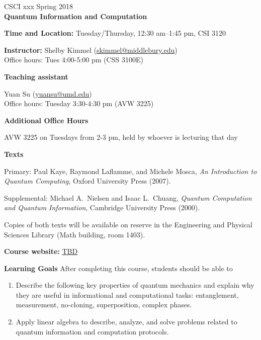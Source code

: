 \documentclass[11pt]{article}
\begin{document}

{\Large {CSCI xxx} \hfill Spring 2018} \\[3pt]
{\Large {\bf Quantum Information and Computation}}

\medskip
{\bf Time and Location:} Tuesday/Thursday, 12:30 am--1:45 pm, CSI 3120

\smallskip

{\bf Instructor:}
Shelby Kimmel (\href{mailto:skimmel@middlebury.edu}{skimmel@middlebury.edu}) \\
Office hours: Tues 4:00-5:00 pm (CSS 3100E)


\smallskip

{\bf Teaching assistant}

Yuan Su (\href{mailto:yuansu@umd.edu}{yuansu@umd.edu}) \\
Office hours: Tuesday 3:30-4:30 pm (AVW 3225)

\smallskip 

{\bf Additional Office Hours}

AVW 3225 on Tuesdays from 2-3 pm, held by whoever is lecturing that day

\medskip
{\bf Texts}

Primary: Paul Kaye, Raymond Laflamme, and Michele Mosca, \emph{An Introduction to Quantum Computing}, Oxford University Press (2007).

Supplemental: Michael A.\ Nielsen and Isaac L.\ Chuang, \emph{Quantum Computation and Quantum Information}, Cambridge University Press (2000).

Copies of both texts will be available on reserve in the Engineering and Physical Sciences Library (Math building, room 1403).

\medskip

{\bf Course website:} \url{TBD}

\medskip

{\bf Learning Goals} After completing this course, students should be able to
\begin{enumerate}
\item Describe the following key properties of quantum mechanics and explain why they are useful in informational and computational tasks: entanglement, measurement, no-cloning, superposition, complex phases.
\item Apply linear algebra to describe, analyze, and solve problems related to quantum information and computation protocols.
\end{enumerate}
\end{document}
